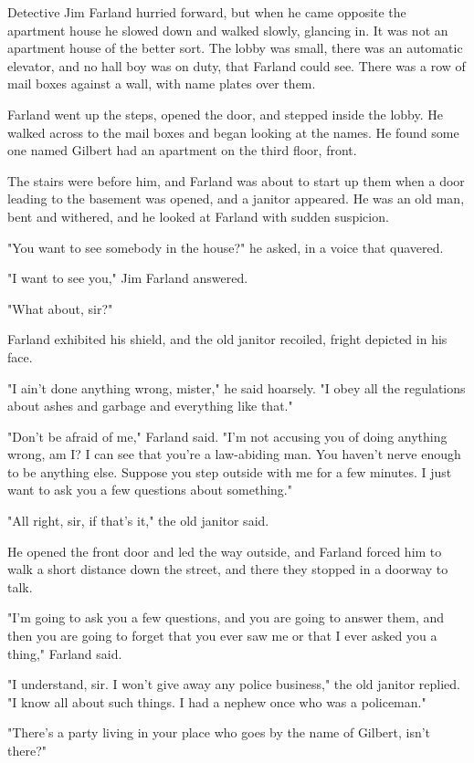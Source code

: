 \documentclass{novel}
\begin{document}
Detective Jim Farland hurried forward, but when he came opposite the apartment house he slowed down and walked slowly, glancing in. It was not an apartment house of the better sort. The lobby was small, there was an automatic elevator, and no hall boy was on duty, that Farland could see. There was a row of mail boxes against a wall, with name plates over them.

Farland went up the steps, opened the door, and stepped inside the lobby. He walked across to the mail boxes and began looking at the names. He found some one named Gilbert had an apartment on the third floor, front.

The stairs were before him, and Farland was about to start up them when a door leading to the basement was opened, and a janitor appeared. He was an old man, bent and withered, and he looked at Farland with sudden suspicion.

"You want to see somebody in the house?" he asked, in a voice that quavered.

"I want to see you," Jim Farland answered.

"What about, sir?"

Farland exhibited his shield, and the old janitor recoiled, fright depicted in his face.

"I ain't done anything wrong, mister," he said hoarsely. "I obey all the regulations about ashes and garbage and everything like that."

"Don't be afraid of me," Farland said. "I'm not accusing you of doing anything wrong, am I? I can see that you're a law-abiding man. You haven't nerve enough to be anything else. Suppose you step outside with me for a few minutes. I just want to ask you a few questions about something."

"All right, sir, if that's it," the old janitor said.

He opened the front door and led the way outside, and Farland forced him to walk a short distance down the street, and there they stopped in a doorway to talk.

"I'm going to ask you a few questions, and you are going to answer them, and then you are going to forget that you ever saw me or that I ever asked you a thing," Farland said.

"I understand, sir. I won't give away any police business," the old janitor replied. "I know all about such things. I had a nephew once who was a policeman."

"There's a party living in your place who goes by the name of Gilbert, isn't there?"
\end{document}
